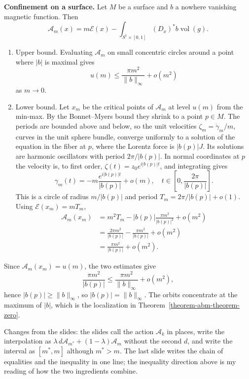 \medskip\noindent
{\bf Confinement on a surface.} Let $M$ be a
surface and $b$ a nowhere vanishing magnetic
function. Then
$$
\mathcal{A}_m(x) = m\mathcal{E}(x)
- \int_{S^1 \times [0,1]}
(D_x)^* b \operatorname{vol}(g).
$$
\begin{enumerate}
\item Upper bound. Evaluating
$\mathcal{A}_m$ on small concentric circles
around a point where $|b|$ is maximal gives
$$
u(m) \le
\frac{\pi m^2}{\|b\|_\infty}
+ o(m^2)
$$
as $m \to 0$.
\item Lower bound. Let $x_m$ be the critical
points of $\mathcal{A}_m$ at level $u(m)$
from the min-max. By the Bonnet--Myers bound
they shrink to a point $p \in M$. The periods
are bounded above and below, so
the unit velocities
$\zeta_m = \dot\gamma_m/m$, curves in the
unit sphere bundle, converge uniformly to a
solution of the equation in the fiber at
$p$, where the Lorentz force is
$|b(p)|J$. Its solutions are harmonic
oscillators with period $2\pi/|b(p)|$. In
normal coordinates at $p$ the velocity is,
to first order,
$\zeta(t) = z_0 e^{i|b(p)|t}$, and
integrating gives
$$
\gamma_m(t) =
-m\frac{e^{i|b(p)|t}}{|b(p)|} + o(m),
\quad
t \in \left[0,
\frac{2\pi}{|b(p)|}\right].
$$
This is a circle of radius $m/|b(p)|$ and
period $T_m = 2\pi/|b(p)| + o(1)$. Using
$\mathcal{E}(x_m) = mT_m$,
$$
\begin{aligned}
\mathcal{A}_m(x_m)
&= m^2T_m - |b(p)|
\frac{\pi m^2}{|b(p)|^2} + o(m^2) \\
&= \frac{2\pi m^2}{|b(p)|}
- \frac{\pi m^2}{|b(p)|} + o(m^2) \\
&= \frac{\pi m^2}{|b(p)|} + o(m^2).
\end{aligned}
$$
\end{enumerate}
Since $\mathcal{A}_m(x_m) = u(m)$, the two
estimates give
$$
\frac{\pi m^2}{|b(p)|}
\le \frac{\pi m^2}{\|b\|_\infty}
+ o(m^2),
$$
hence $|b(p)| \ge \|b\|_\infty$, so
$|b(p)| = \|b\|_\infty$. The orbits
concentrate at the maximum of $|b|$, which
is the localization in
Theorem~\ref{theorem-abm-theorem-zero}.

\begin{remark}
\label{remark-magnetic-slide-corrections}
Changes from the slides: the slides call the
action $\mathcal{A}_k$ in places, write the
interpolation as
$\lambda\, d\mathcal{A}_{m^*}
+ (1-\lambda)\mathcal{A}_m$ without the
second $d$, and write the interval as
$[m^*,m]$ although $m^* > m$. The last
slide writes the chain of equalities and the
inequality in one line; the inequality
direction above is my reading of how the
two ingredients combine.
\end{remark}

